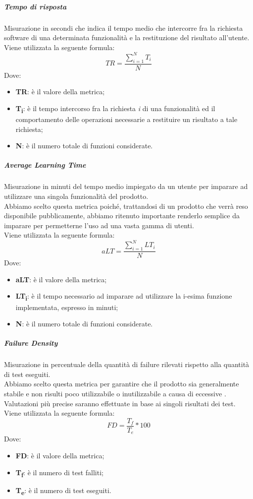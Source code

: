 \subparagraph{Tempo di risposta}\Spazio
Misurazione in secondi che indica il tempo medio che intercorre fra la richiesta software di una determinata funzionalità e la restituzione del risultato all'utente. \\
Viene utilizzata la seguente formula:
$$TR=\frac{\sum\limits_{i=1}^N{T_i}}{N}$$
Dove:
\begin{itemize}
	\item{\textbf{TR}: è il valore della metrica;}
	\item{\textbf{T\textsubscript{i}}: è il tempo intercorso fra la richiesta \emph{i} di una funzionalità ed il comportamento delle operazioni necessarie a restituire un risultato a tale richiesta;}
	\item{\textbf{N}: è il numero totale di funzioni considerate.}
\end{itemize}

\subparagraph{Average Learning Time}\Spazio
Misurazione in minuti del tempo medio impiegato da un utente per imparare ad utilizzare una singola funzionalità del prodotto.
\\Abbiamo scelto questa metrica poiché, trattandosi di un prodotto che verrà reso disponibile pubblicamente, abbiamo ritenuto importante renderlo semplice da imparare per permetterne l'uso ad una vasta gamma di utenti.
\\Viene utilizzata la seguente formula:
$$aLT=\frac{\sum\limits_{i=1}^N{LT_i}}{N}$$
Dove:
\begin{itemize}
	\item{\textbf{aLT}: è il valore della metrica;}
	\item{\textbf{LT\textsubscript{i}}: è il tempo necessario ad imparare ad utilizzare la i-esima funzione implementata, espresso in minuti;}
	\item{\textbf{N}: è il numero totale di funzioni considerate.}
\end{itemize}

\subparagraph{Failure Density}\Spazio
Misurazione in percentuale della quantità di failure rilevati rispetto alla quantità di test eseguiti.
\\Abbiamo scelto questa metrica per garantire che il prodotto sia generalmente stabile e non risulti poco utilizzabile o inutilizzabile a causa di eccessive . Valutazioni più precise saranno effettuate in base ai singoli risultati dei test.\\
Viene utilizzata la seguente formula:
$$FD=\frac{T_f}{T_e}*100$$
Dove:
\begin{itemize}
	\item{\textbf{FD}: è il valore della metrica;}
	\item{\textbf{T\textsubscript{f}}: è il numero di test falliti;}
	\item{\textbf{T\textsubscript{e}}: è il numero di test eseguiti.}
\end{itemize}

